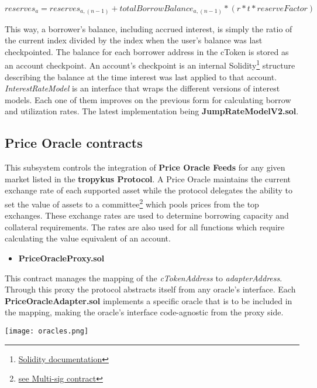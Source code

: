 \documentclass{article}
\begin{document}
\begin{center}
$reserves_{a}= reserves_{a,(n-1)}+ totalBorrowBalance_{a,(n-1)}*(r*t*reserveFactor)$
\end{center}

This way, a borrower's balance, including accrued interest, is simply the ratio of the current index divided by the index when the user's balance was last checkpointed. The balance for each borrower address in the cToken is stored as an account checkpoint. An account's checkpoint is an internal Solidity\footnote{\href{https://docs.soliditylang.org/en/v0.8.1/}{Solidity documentation}} structure describing the balance at the time interest was last applied to that account.
\\
\textit{InterestRateModel} is an interface that wraps the different versions of interest models. Each one of them improves on the previous form for calculating borrow and utilization rates. The latest implementation being \textbf{JumpRateModelV2.sol}.


\subsection{Price Oracle contracts}
This subsystem controls the integration of \textbf{Price Oracle Feeds} for any given market listed in the \textbf{tropykus Protocol}. A Price Oracle maintains the current exchange rate of each supported asset while the protocol delegates the ability to set the value of assets to a committee\footnote{\href{https://tropykus.app/docs/security}{see Multi-sig contract}} which pools prices from the top exchanges. These exchange rates are used to determine borrowing capacity and collateral requirements. The rates are also used for all functions which require calculating the value equivalent of an account.

\begin{itemize}
\item\textbf{PriceOracleProxy.sol}
\end{itemize}

This contract manages the mapping of the \textit{cTokenAddress} to \textit{adapterAddress}. Through this proxy the protocol abstracts itself from any oracle's interface. Each \textbf{PriceOracleAdapter.sol} implements a specific oracle that is to be included in the mapping, making the oracle's interface code-agnostic from the proxy side.

\begin{center}
\texttt{[image: oracles.png]}
\end{center}
\end{document}
